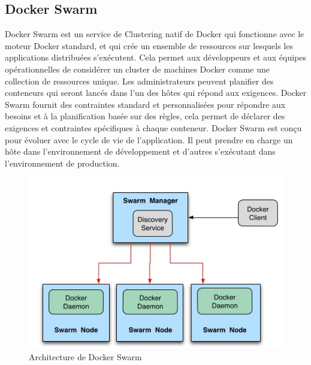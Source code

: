 \begin{onehalfspace}
\subsection*{Docker Swarm}
 Docker Swarm est un service de Clustering natif de Docker qui fonctionne avec le moteur Docker standard, et qui crée un ensemble de ressources sur lesquels les applications distribuées s'exécutent. Cela permet aux développeurs et aux équipes opérationnelles de considérer un cluster de machines Docker comme une collection de ressources unique. Les administrateurs peuvent planifier des conteneurs qui seront lancés dans l'un des hôtes qui répond aux exigences. Docker Swarm fournit des contraintes standard et personnalisées pour répondre aux besoins et à la planification basée sur des règles, cela permet de déclarer des exigences et contraintes spécifiques à chaque conteneur. Docker Swarm est conçu pour évoluer avec le cycle de vie de l'application. Il peut prendre en charge un hôte dans l'environnement de développement et d'autres s'exécutant dans l'environnement de production.
\begin{figure}[H]
\centering
\includegraphics [scale=0.6]{chapitre3/assets/dockerswarm.png}
\caption{Architecture de Docker Swarm \cite{docker}}
\end{figure}

\end{onehalfspace}
